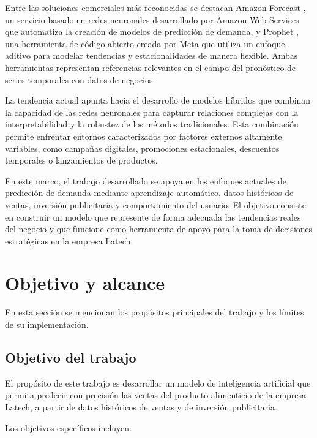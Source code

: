 Entre las soluciones comerciales más reconocidas se destacan Amazon Forecast 
\citep{amazonforecast}, un servicio basado en redes neuronales desarrollado por 
Amazon Web Services \citep{aws} que automatiza la creación de modelos de 
predicción de demanda, y Prophet \citep{taylor2018forecasting}, una herramienta 
de código abierto creada por Meta \citep{meta} que utiliza un enfoque aditivo 
para modelar tendencias y estacionalidades de manera flexible. Ambas 
herramientas representan referencias relevantes en el campo del pronóstico de 
series temporales con datos de negocios.

La tendencia actual apunta hacia el desarrollo de modelos híbridos que combinan 
la capacidad de las redes neuronales para capturar relaciones complejas con la 
interpretabilidad y la robustez de los métodos tradicionales. Esta combinación 
permite enfrentar entornos caracterizados por factores externos altamente 
variables, como campañas digitales, promociones estacionales, descuentos 
temporales o lanzamientos de productos.

En este marco, el trabajo desarrollado se apoya en los enfoques actuales de 
predicción de demanda mediante aprendizaje automático, datos históricos de 
ventas, inversión publicitaria y comportamiento del usuario. El objetivo 
consiste en construir un modelo que represente de forma adecuada las 
tendencias reales del negocio y que funcione como herramienta de apoyo 
para la toma de decisiones estratégicas en la empresa Latech.



\pagebreak
\section{Objetivo y alcance}

En esta sección se mencionan los propósitos principales del trabajo y los límites de su implementación.

\subsection{Objetivo del trabajo}

El propósito de este trabajo es desarrollar un modelo de inteligencia artificial que permita predecir con precisión las ventas del producto alimenticio de la empresa Latech, a partir de datos históricos de ventas y de inversión publicitaria. 

Los objetivos específicos incluyen:

